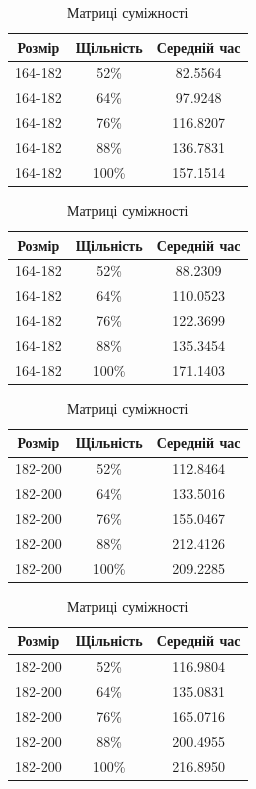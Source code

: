 \documentclass[12pt, letterpaper, twoside]{article}
\begin{document}
\begin{table}[htbp]
\begin{minipage}[b]{0.51\linewidth}
\begin{tabular}{|c|c|c|}
\hline
Розмір & Щільність & Середній час\\
\hline
164-182 & 52\% & 82.5564 \\
164-182  & 64\% & 97.9248 \\
164-182  & 76\% & 116.8207 \\
164-182  & 88\% & 136.7831 \\
164-182  & 100\% & 157.1514 \\
\hline
\end{tabular}
\caption{Списки суміжності}
\end{minipage}
\begin{minipage}[b]{0.51\linewidth}
\begin{tabular}{|c|c|c|}
\hline
Розмір & Щільність & Середній час\\
\hline
164-182  & 52\% & 88.2309 \\
164-182  & 64\% & 110.0523 \\
164-182  & 76\% & 122.3699 \\
164-182  & 88\% & 135.3454 \\
164-182  & 100\% & 171.1403 \\
\hline
\end{tabular}
\caption{Матриці суміжності}
\end{minipage}	
\end{table}
\begin{table}[htbp]
\begin{minipage}[b]{0.51\linewidth}
\begin{tabular}{|c|c|c|}
\hline
Розмір & Щільність & Середній час\\
\hline
182-200 & 52\% & 112.8464 \\
182-200  & 64\% & 133.5016 \\
182-200  & 76\% & 155.0467 \\
182-200  & 88\% & 212.4126 \\
182-200  & 100\% & 209.2285 \\
\hline
\end{tabular}
\caption{Списки суміжності}
\end{minipage}
\begin{minipage}[b]{0.51\linewidth}
\begin{tabular}{|c|c|c|}
\hline
Розмір & Щільність & Середній час\\
\hline
182-200  & 52\% & 116.9804 \\
182-200  & 64\% & 135.0831 \\
182-200  & 76\% & 165.0716 \\
182-200  & 88\% & 200.4955 \\
182-200  & 100\% & 216.8950 \\
\hline
\end{tabular}
\caption{Матриці суміжності}
\end{minipage}
\end{table}
\end{document}
